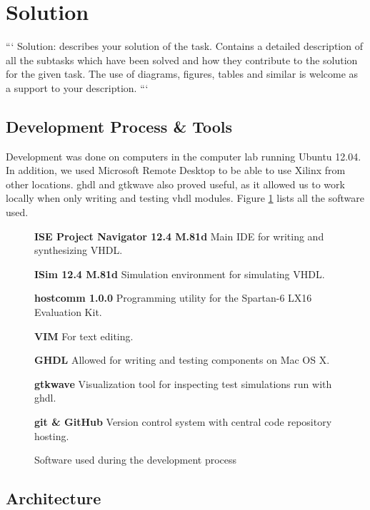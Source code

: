 \section{Solution}

```
Solution: describes your solution of the task.
Contains a detailed description of all the subtasks which have been solved and how they contribute to the solution for the given task.
The use of diagrams, figures, tables and similar is welcome as a support to your description.
```

\subsection{Development Process \& Tools}

Development was done on computers in the computer lab running Ubuntu 12.04.
In addition, we used Microsoft Remote Desktop to be able to use Xilinx from other locations.
ghdl and gtkwave also proved useful, as it allowed us to work locally when only writing and testing vhdl modules. Figure \ref{fig:software} lists all the software used.

\begin{figure}[ht!]
    \begin{description}
        \item{\textbf{ISE Project Navigator 12.4 M.81d}}
            Main IDE for writing and synthesizing VHDL.
        \item{\textbf{ISim 12.4 M.81d}}
            Simulation environment for simulating VHDL.
        \item{\textbf{hostcomm 1.0.0}}
            Programming utility for the Spartan-6 LX16 Evaluation Kit.
        \item{\textbf{VIM}}
            For text editing.
        \item{\textbf{GHDL}}
            Allowed for writing and testing components on Mac OS X.
        \item{\textbf{gtkwave}}
            Visualization tool for inspecting test simulations run with ghdl.
        \item{\textbf{git \& GitHub}}
            Version control system with central code repository hosting.
    \label{fig:software}
    \end{description}
    \caption{Software used during the development process}
\end{figure}

\subsection{Architecture}


